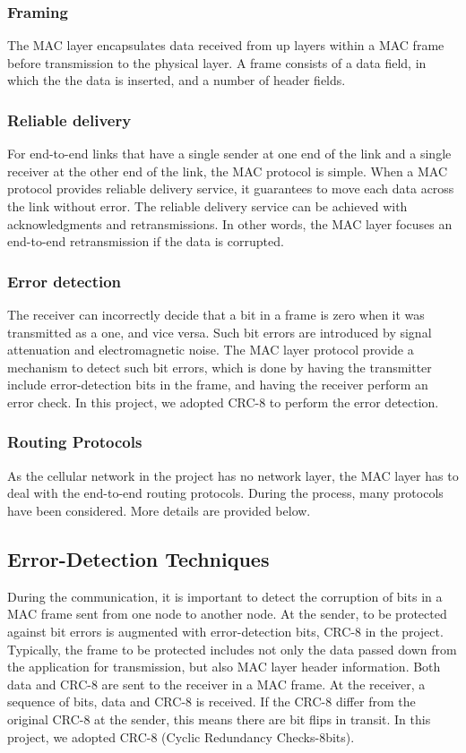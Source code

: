 \subsubsection{Framing} The MAC layer encapsulates data received from up layers within a MAC frame before transmission to the physical layer. A frame consists of a data field, in which the the data is inserted, and a number of header fields. 
\subsubsection{Reliable delivery} For end-to-end links that have a single sender at one end of the link and a single receiver at the other end of the link, the MAC protocol is simple. When a MAC protocol provides reliable delivery service, it guarantees to move each data across the link without error.  The reliable delivery service can be achieved with acknowledgments and retransmissions. In other words, the MAC layer focuses an end-to-end retransmission if the data is corrupted. 
\subsubsection{Error detection} The receiver can incorrectly decide that a bit in a frame is zero when it was transmitted as a one, and vice versa. Such bit errors are introduced by signal attenuation and electromagnetic noise. The MAC layer protocol provide a mechanism to detect such bit errors, which is done by having the transmitter include error-detection bits in the frame, and having the receiver perform an error check. In this project, we adopted CRC-8 to perform the error detection. 
\subsubsection{Routing Protocols} As the cellular network in the project has no network layer, the MAC layer has to deal with the end-to-end routing protocols. During the process, many protocols have been considered. More details are provided below. 




\subsection{Error-Detection Techniques}
During the communication, it is important to detect the corruption of bits in a MAC frame sent from one node to another node. At the sender, to be protected against bit errors is augmented with error-detection bits, CRC-8 in the project. Typically, the frame to be protected includes not only the data passed down from the application for transmission, but also MAC layer header information. Both data and CRC-8 are sent to the receiver in a MAC frame. At the receiver, a sequence of bits, data and CRC-8 is received. If the CRC-8 differ from the original CRC-8 at the sender, this means there are bit flips in transit.  In this project, we adopted CRC-8 (Cyclic Redundancy Checks-8bits). 

